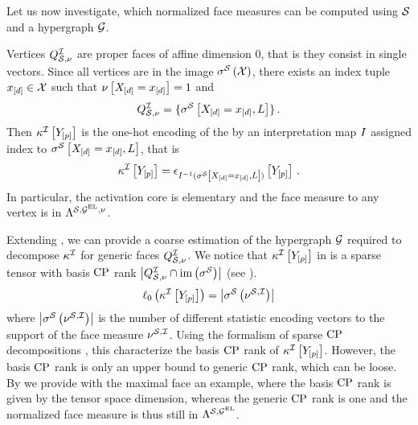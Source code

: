 %
Let us now investigate, which normalized face measures can be computed using $\mathcal{S}$ and a hypergraph $\mathcal{G}$.

\begin{example}[Vertices]
    \label{exa:vertexMeasures}
    Vertices $Q^{\mathcal{I}}_{\mathcal{S},\nu}$ are proper faces of affine dimension $0$, that is they consist in single vectors.
    Since all vertices are in the image $\sigma^{\mathcal{S}}\left(\mathcal{X}\right)$, there exists an index tuple $x_{[d]}\in\mathcal{X}$ such that $\nu\left[X_{[d]}=x_{[d]}\right]=1$ and
    \begin{align*}
        Q^{\mathcal{I}}_{\mathcal{S},\nu} = \{\sigma^{\mathcal{S}}\left[X_{[d]}=x_{[d]},L\right]\} \, .
    \end{align*}
    Then $\kappa^{\mathcal{I}}\left[Y_{[p]}\right]$ is the one-hot encoding of the by an interpretation map $I$ assigned index to $\sigma^{\mathcal{S}}\left[X_{[d]}=x_{[d]},L\right]$, that is
    \begin{align*}
        \kappa^{\mathcal{I}}\left[Y_{[p]}\right] = \epsilon_{I^{-1}(\sigma^{\mathcal{S}}\left[X_{[d]}=x_{[d]},L\right])}\left[Y_{[p]}\right] \, .
    \end{align*}
    In particular, the activation core is elementary and the face measure to any vertex is in $\Lambda^{\mathcal{S},\mathcal{G}^{\mathrm{EL}},\nu}$.
\end{example}


Extending , we can provide a coarse estimation of the hypergraph $\mathcal{G}$ required to decompose $\kappa^{\mathcal{I}}$ for generic faces $Q^{\mathcal{I}}_{\mathcal{S},\nu}$.
We notice that $\kappa^{\mathcal{I}}\left[Y_{[p]}\right]$ in  is a sparse tensor with basis $\mathrm{CP}$ rank $\left|Q^{\mathcal{I}}_{\mathcal{S},\nu}\cap\mathrm{im}\left(\sigma^{\mathcal{S}}\right)\right|$ (see ).
\begin{align*}
    \ell_0\left(\kappa^{\mathcal{I}}\left[Y_{[p]}\right]\right)
    = \left|
        \sigma^{\mathcal{S}}\left(\nu^{\mathcal{S},\mathcal{I}}\right)
    \right|
\end{align*}
where $\left|\sigma^{\mathcal{S}}\left(\nu^{\mathcal{S},\mathcal{I}}\right)\right|$ is the number of different statistic encoding vectors to the support of the face measure $\nu^{\mathcal{S},\mathcal{I}}$.
Using the formalism of sparse $\mathrm{CP}$ decompositions , this characterize the basis $\mathrm{CP}$ rank of $\kappa^{\mathcal{I}}\left[Y_{[p]}\right]$.
However, the basis $\mathrm{CP}$ rank is only an upper bound to generic $\mathrm{CP}$ rank, which can be loose.
By  we provide with the maximal face an example, where the basis $\mathrm{CP}$ rank is given by the tensor space dimension, whereas the generic $\mathrm{CP}$ rank is one and the normalized face measure is thus still in $\Lambda^{\mathcal{S},\mathcal{G}^{\mathrm{EL}}}$.

